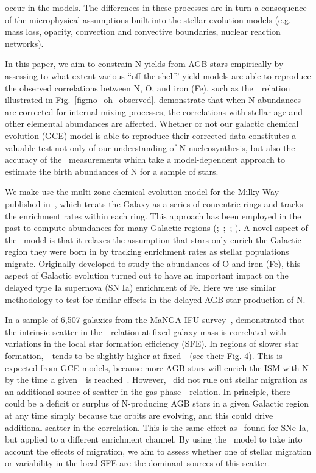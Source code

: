 \documentclass[ms.tex]{subfiles}
\begin{document}
occur in the models.
The differences in these processes are in turn a consequence of the
microphysical assumptions built into the stellar evolution models (e.g. mass
loss, opacity, convection and convective boundaries, nuclear reaction networks).
\par
In this paper, we aim to constrain N yields from AGB stars empirically by
assessing to what extent various ``off-the-shelf'' yield models are able to
reproduce the observed correlations between N, O, and iron (Fe), such as
the~\ohno~relation illustrated in Fig.~\ref{fig:no_oh_observed}.
\citet{Vincenzo2021} demonstrate that when N abundances are corrected for
internal mixing processes, the correlations with stellar age and other
elemental abundances are affected.
Whether or not our galactic chemical evolution (GCE) model is able to reproduce
their corrected data constitutes a valuable test not only of our understanding
of N nucleosynthesis, but also the accuracy of the~\citet{Vincenzo2021}
measurements which take a model-dependent approach to estimate the birth
abundances of N for a sample of stars.
\par
We make use the multi-zone chemical evolution model for the Milky Way
published in~\citet{Johnson2021}, which treats the Galaxy as a series of
concentric rings and tracks the enrichment rates within each ring.
This approach has been employed in the past to compute abundances for many
Galactic regions (\citealp{Matteucci1989, Wyse1989, Prantzos1995,
Schoenrich2009};~\citealp*{Minchev2013, Minchev2014};~\citealp{Minchev2017};
\citealp*{Sharma2020}).
A novel aspect of the~\citet{Johnson2021} model is that it relaxes the
assumption that stars only enrich the Galactic region they were born in by
tracking enrichment rates as stellar populations migrate.
Originally developed to study the abundances of O and iron (Fe), this aspect of
Galactic evolution turned out to have an important impact on the delayed type
Ia supernova (SN Ia) enrichment of Fe.
Here we use similar methodology to test for similar effects in the delayed AGB
star production of N.
\par
In a sample of 6,507 galaxies from the MaNGA IFU survey~\citep{Bundy2015},
\citet{Schaefer2020} demonstrated that the intrinsic scatter in
the~\ohno~relation at fixed galaxy mass is correlated with variations in the
local star formation efficiency (SFE).
In regions of slower star formation,~\no~tends to be slightly higher at
fixed~\oh~(see their Fig. 4).
This is expected from GCE models, because more AGB stars will enrich the ISM
with N by the time a given~\oh~is reached~\citep[e.g.][]{Molla2006,
Vincenzo2016a}.
However,~\citet{Schaefer2020} did not rule out stellar migration as an
additional source of scatter in the gas phase~\ohno~relation.
In principle, there could be a deficit or surplus of N-producing AGB stars in a
given Galactic region at any time simply because the orbits are evolving, and
this could drive additional scatter in the correlation.
This is the same effect as~\citet{Johnson2021} found for SNe Ia, but applied to
a different enrichment channel.
By using the~\citet{Johnson2021} model to take into account the effects of
migration, we aim to assess whether one of stellar migration or variability in
the local SFE are the dominant sources of this scatter.
\end{document}
